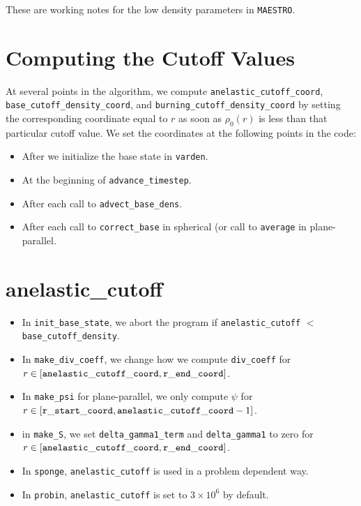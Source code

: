 These are working notes for the low density parameters in {\tt MAESTRO}.

\section{Computing the Cutoff Values}

At several points in the algorithm, we compute {\tt anelastic\_cutoff\_coord}, 
{\tt base\_cutoff\_density\_coord}, and {\tt burning\_cutoff\_density\_coord} by 
setting the corresponding coordinate equal to $r$ as soon as $\rho_0(r)$ is less than 
that particular cutoff value.  We set the coordinates at the following points in the
code:

\begin{itemize}

\item After we initialize the base state in {\tt varden}.

\item At the beginning of {\tt advance\_timestep}.

\item After each call to {\tt advect\_base\_dens}.

\item After each call to {\tt correct\_base} in spherical 
  (or call to {\tt average} in plane-parallel.

\end{itemize}

\section{anelastic\_cutoff}

\begin{itemize}

\item In {\tt init\_base\_state}, we abort the program if 
  {\tt anelastic\_cutoff} $<$ {\tt base\_cutoff\_density}.

\item In {\tt make\_div\_coeff}, we change how we compute {\tt div\_coeff} 
  for $r\in[{\tt anelastic\_cutoff\_coord},{\tt r\_end\_coord}]$.

\item In {\tt make\_psi} for plane-parallel, we only compute $\psi$ for 
  $r\in[{\tt r\_start\_coord},{\tt anelastic\_cutoff\_coord}-1]$.

\item in {\tt make\_S}, we set {\tt delta\_gamma1\_term} and {\tt delta\_gamma1} 
  to zero for $r\in[{\tt anelastic\_cutoff\_coord},{\tt r\_end\_coord}]$.

\item In {\tt sponge}, {\tt anelastic\_cutoff} is used in a problem
  dependent way.

\item In {\tt probin}, {\tt anelastic\_cutoff} is set to $3\times 10^6$
  by default.

\end{itemize}


